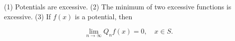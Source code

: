 (1) Potentials are excessive.
(2) The minimum of two excessive functions is excessive.
(3) If $f(x)$ is a potential, then

$$\lim_{n \to \infty} Q_nf(x) = 0, \quad x \in S.$$